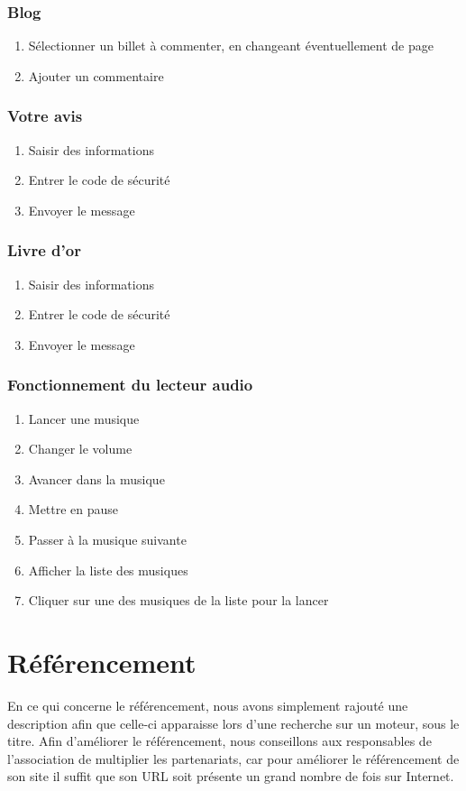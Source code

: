 \documentclass[11pt]{report}
\begin{document}
\subsubsection*{Blog}
\begin{enumerate}
\item Sélectionner un billet à commenter, en changeant éventuellement de page
\item Ajouter un commentaire
\end{enumerate}
\subsubsection*{Votre avis}
\begin{enumerate}
\item Saisir des informations 
\item Entrer le code de sécurité
\item Envoyer le message
\end{enumerate}
\subsubsection*{Livre d’or}
\begin{enumerate}
\item Saisir des informations 
\item Entrer le code de sécurité
\item Envoyer le message
\end{enumerate}

\subsubsection*{Fonctionnement du lecteur audio}
\begin{enumerate}
\item Lancer une musique
\item Changer le volume
\item Avancer dans la musique
\item Mettre en pause
\item Passer à la musique suivante
\item Afficher la liste des musiques
\item Cliquer sur une des musiques de la liste pour la lancer

\end{enumerate}

\section{Référencement}
En ce qui concerne le référencement, nous avons simplement rajouté une
description afin que celle-ci apparaisse lors d'une recherche sur un moteur,
sous le titre. Afin d'améliorer le référencement, nous conseillons aux
responsables de l’association de multiplier les partenariats, car pour améliorer
le référencement de son site il suffit que son URL soit présente un grand nombre
de fois sur Internet.
\end{document}
